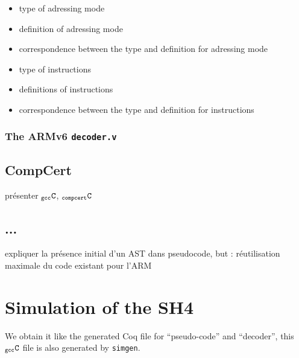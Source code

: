 \documentclass[a4paper, 11pt]{article}
\newcommand{\simgen}{{\tt simgen}\xspace}
\newcommand{\C}{$_{\tt compcert}{\tt C}$\xspace}
\newcommand{\gccC}{$_{\tt gcc}{\tt C}$\xspace}
\begin{document}
  \begin{itemize}
  \item type of adressing mode
  \item definition of adressing mode
  \item correspondence between the type and definition for adressing mode
  \item type of instructions
  \item definitions of instructions
  \item correspondence between the type and definition for instructions
  \end{itemize}
\subsubsection{The ARMv6 {\tt decoder.v}}

\subsection{CompCert}
présenter \gccC, \C
\subsection{...}
expliquer la présence initial d'un AST dans pseudocode, but : réutilisation maximale du code existant pour l'ARM 
\section{Simulation of the SH4}
We obtain it like the generated Coq file for ``pseudo-code'' and ``decoder'', this \gccC file is also generated by \simgen.
\end{document}
